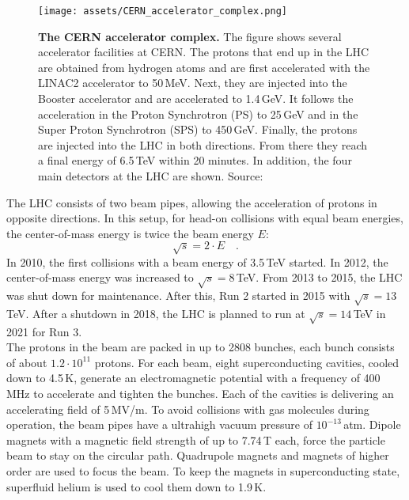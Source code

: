 \begin{figure}
\centering
\texttt{[image: assets/CERN\_accelerator\_complex.png]}
\caption[CERN Accelerator Complex]{\textbf{The CERN accelerator complex.} The figure shows several accelerator facilities at CERN. The protons that end up in the LHC are obtained from hydrogen atoms and are first accelerated with the \textcolor{LINAC2}{LINAC2} accelerator to 50\,MeV. Next, they are injected into the \textcolor{LINAC2}{Booster} accelerator and are accelerated to 1.4\,GeV. It follows the acceleration in the \textcolor{PS}{Proton Synchrotron (PS)} to 25\,GeV and in the \textcolor{SPS}{Super Proton Synchrotron (SPS)} to 450\,GeV. Finally, the protons are injected into the \textcolor{LHC}{LHC} in both directions. From there they reach a final energy of 6.5\,TeV within 20 minutes. In addition, the four main detectors at the LHC are shown. Source: \cite{cernacccompl}}
\label{fig:ch_2_cernacccompl}
\end{figure}

The LHC consists of two beam pipes, allowing the acceleration of protons in opposite directions. In this setup, for head-on collisions with equal beam energies, the center-of-mass energy is twice the beam energy $E$:
\begin{equation}
\sqrt{s} = 2 \cdot E \quad .
\end{equation}
In 2010, the first collisions with a beam energy of 3.5\,TeV started. In 2012, the center-of-mass energy was increased to $\sqrt{s} = 8$\,TeV. From 2013 to 2015, the LHC was shut down for maintenance. After this, Run 2 started in 2015 with $\sqrt{s} = 13$\,TeV. After a shutdown in 2018, the LHC is planned to run at $\sqrt{s} = 14$\,TeV in 2021 for Run 3. \\

The protons in the beam are packed in up to 2808 bunches, each bunch consists of about $1.2 \cdot 10^{11}$ protons. For each beam, eight superconducting cavities, cooled down to 4.5\,K, generate an electromagnetic potential with a frequency of 400\,MHz to accelerate and tighten the bunches. Each of the cavities is delivering an accelerating field of 5\,MV/m. To avoid collisions with gas molecules during operation, the beam pipes have a ultrahigh vacuum pressure of $10^{-13}$\,atm. Dipole magnets with a magnetic field strength of up to 7.74\,T each, force the particle beam to stay on the circular path. Quadrupole magnets and magnets of higher order are used to focus the beam. To keep the magnets in superconducting state, superfluid helium is used to cool them down to 1.9\,K. \\

